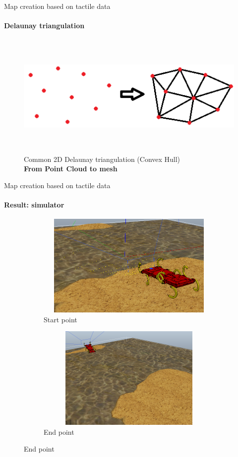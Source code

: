 \documentclass[aspectratio=169,xcolor=table]{beamer}
\begin{document}
\begin{frame}[t]{Map creation based on tactile data}
    \framesubtitle{Delaunay triangulation}
    \vspace{-0.2cm}
    \begin{figure}[H]
        \centering\includegraphics[height=6cm,width=1\textwidth,keepaspectratio]{delone_idea.png}
        \caption*{Common 2D Delaunay triangulation (Convex Hull) \\ \textbf{From Point Cloud to mesh}}
        \label{fig:delone_idea.png}
    \end{figure}
\end{frame}

\begin{frame}[t]{Map creation based on tactile data}
    \framesubtitle{Result: simulator}
    \vspace{-15pt}
    \begin{figure}[H]
        \begin{subfigure}[t]{0.49\textwidth}
            \centering\includegraphics[height=5cm,width=1\textwidth,keepaspectratio]{terrain_w_water1.png}
            \caption*{Start point}
        \end{subfigure}
        \begin{subfigure}[t]{0.49\textwidth}
            \centering\includegraphics[height=5cm,width=1\textwidth,keepaspectratio]{terrain_w_water_end.png}
            \caption*{End point}
        \end{subfigure}
    \end{figure}
\end{frame}
\end{document}
